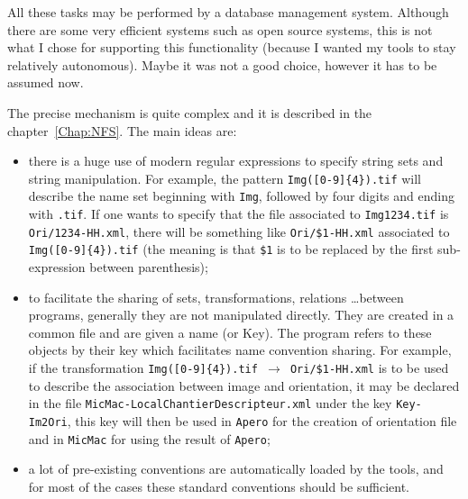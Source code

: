 All these tasks may be performed by a database management system. Although there
are some very efficient systems such as open source systems, this is not what I chose
for supporting this functionality (because I wanted my tools to stay relatively autonomous).
Maybe it was not a good choice, however it has to be assumed now.


The precise mechanism is quite complex and it is described in the chapter~\ref{Chap:NFS}. 
The main ideas are:

\begin{itemize}
   \item there is a huge use of modern regular expressions to specify string sets and
         string manipulation. For example, the pattern {\tt Img([0-9]\{4\}).tif} will
         describe the name set beginning with {\tt Img}, followed by four digits and ending
         with {\tt .tif}. If one wants to specify that the file associated  to {\tt Img1234.tif}
         is {\tt Ori/1234-HH.xml}, there will be something like {\tt  Ori/\$1-HH.xml} associated
        to {\tt Img([0-9]\{4\}).tif}  (the meaning is that {\tt \$1}  is to be replaced by 
          the first sub-expression between parenthesis);



   \item to facilitate the sharing of sets, transformations, relations \dots between programs,
         generally they are not manipulated directly. They are created in a common file and
         are given a name (or Key). The program refers to these objects by their key which
         facilitates name convention sharing. For example, if the transformation
         {\tt Img([0-9]\{4\}).tif $\rightarrow$  Ori/\$1-HH.xml} is to be used
         to describe the association between image and orientation, it  may be declared in
         the file {\tt MicMac-LocalChantierDescripteur.xml} under the key {\tt Key-Im2Ori},
         this key will then be used in {\tt Apero} for the creation of orientation file and in
         {\tt MicMac} for using the result of {\tt Apero};
         
          
     \item a lot of pre-existing conventions are automatically loaded by the tools, and
           for most of the cases these standard conventions should be sufficient.
\end{itemize}




